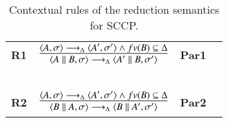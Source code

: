 \documentclass[main.tex]{subfiles}
\begin{document}
\begin{table}  %
   \begin{center}
   \begin{tabular}{llll} 
  \mbox{\bf R1}& $\frac {\displaystyle \langle A,\sigma \rangle \longrightarrow_\Delta \langle A', \sigma' \rangle
  \wedge fv(B) \subseteq \Delta} 
  {\displaystyle \begin{array}{l}
                          \langle A\parallel B, \sigma \rangle \longrightarrow_\Delta \langle A'\parallel B, \sigma' \rangle
                          \end{array}}$ 
    & \bf{Par1}&
  \\
  & \mbox{   }&\mbox{   }&
  \\
    \mbox{\bf R2}& $\frac {\displaystyle \langle A,\sigma \rangle \longrightarrow_\Delta \langle A', \sigma'   \rangle
    	\wedge fv(B) \subseteq \Delta} 
    {\displaystyle 
    	\begin{array}{l} \langle B\parallel A, \sigma \rangle \longrightarrow_\Delta \langle B\parallel A', \sigma' \rangle
    	\end{array}}$& \bf{Par2}&
  \end{tabular}
  \end{center}
\caption{Contextual rules of the reduction semantics for SCCP.}
\label{fig:operational2}
\end{table}

\def\odiv{\, {\ominus\hspace{-7.8pt} \div} \,}
\def\odivvv{\; {\ominus\hspace{-4.7pt} \div} \;}
\end{document}
